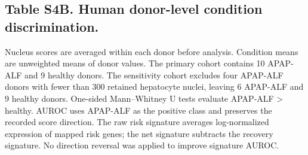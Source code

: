 \subsection*{Table S4B. Human donor-level condition discrimination.}\label{tab:S4B}
\noindent Nucleus scores are averaged within each donor before analysis. Condition means are unweighted means of donor values. The primary cohort contains 10 APAP-ALF and 9 healthy donors. The sensitivity cohort excludes four APAP-ALF donors with fewer than 300 retained hepatocyte nuclei, leaving 6 APAP-ALF and 9 healthy donors. One-sided Mann--Whitney U tests evaluate APAP-ALF > healthy. AUROC uses APAP-ALF as the positive class and preserves the recorded score direction. The raw risk signature averages log-normalized expression of mapped risk genes; the net signature subtracts the recovery signature. No direction reversal was applied to improve signature AUROC.

